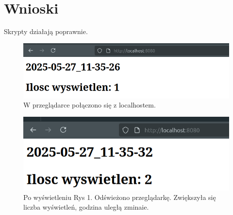 \documentclass{article}
\begin{document}
    \section{Wnioski}
        Skrypty działają poprawnie.
        \begin{figure}[ht]
            \centering
            \includegraphics[width=\textwidth]{images/wysw_1.png}
            \caption{W przeglądarce połączono się z localhostem.}
            \label{fig:run_succes_2}
        \end{figure}

        \begin{figure}[ht]
            \centering
            \includegraphics[width=\textwidth]{images/wysw_2.png}
            \caption{Po wyświetleniu Rys 1. Odświeżono przeglądarkę. Zwiększyła się liczba wyświetleń, godzina uległą zminaie.}
            \label{fig:run_succes}
        \end{figure}
\end{document}
